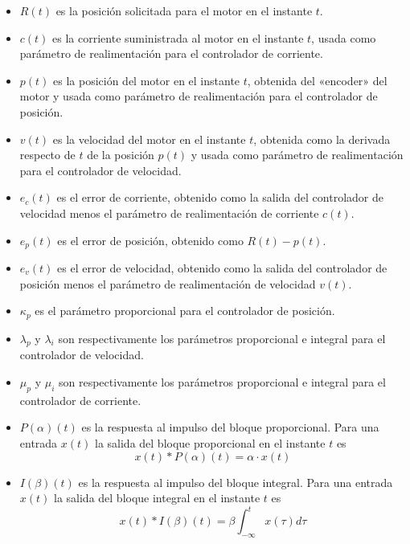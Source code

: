 \documentclass[english,spanish,a4paper,11pt]{article}
\begin{document}
\begin{itemize}
    \item $R(t)$ es la posición solicitada para el motor en el instante $t$.
    
    \item $c(t)$ es la corriente suministrada al motor en el instante $t$, usada como parámetro de realimentación para el controlador de corriente.
    
    \item $p(t)$ es la posición del motor en el instante $t$, obtenida del «encoder» del motor y usada como parámetro de realimentación para el controlador de posición.
    
    \item $v(t)$ es la velocidad del motor en el instante $t$, obtenida como la derivada respecto de $t$ de la posición $p(t)$ y usada como parámetro de realimentación para el controlador de velocidad.
    
    \item $e_c(t)$ es el error de corriente, obtenido como la salida del controlador de velocidad menos el parámetro de realimentación de corriente $c(t)$.

    \item $e_p(t)$ es el error de posición, obtenido como $R(t) - p(t)$.
    
    \item $e_v(t)$ es el error de velocidad, obtenido como la salida del controlador de posición menos el parámetro de realimentación de velocidad $v(t)$.

    \item $\kappa_p$ es el parámetro proporcional para el controlador de posición.
        
    \item $\lambda_p$ y $\lambda_i$ son respectivamente los parámetros proporcional e integral para el controlador de velocidad.
    
    \item $\mu_p$ y $\mu_i$ son respectivamente los parámetros proporcional e integral para el controlador de corriente.
    
    \item $P(\alpha)(t)$ es la respuesta al impulso del bloque proporcional. Para una entrada $x(t)$ la salida del bloque proporcional en el instante $t$ es
    \begin{equation}
        x(t) * P(\alpha)(t) = \alpha \cdot x(t)
    \end{equation}
    
    \item $I(\beta)(t)$ es la respuesta al impulso del bloque integral. Para una entrada $x(t)$ la salida del bloque integral en el instante $t$ es
    \begin{equation}
        x(t) * I(\beta)(t) = \beta \int_{-\infty}^t x(\tau) d\tau
    \end{equation}
\end{itemize}
\end{document}
